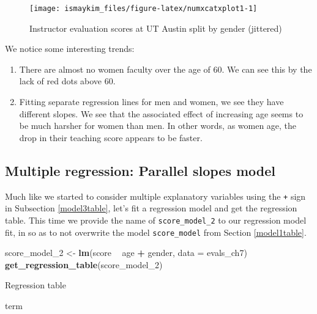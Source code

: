 \documentclass[12pt,]{krantz}
\makeatletter
\newenvironment{Shaded}{\begin{snugshade}}{\end{snugshade}}
\newcommand{\KeywordTok}[1]{\textcolor[rgb]{0.27,0.27,0.27}{\textbf{#1}}}
\newcommand{\DataTypeTok}[1]{\textcolor[rgb]{0.27,0.27,0.27}{#1}}
\newcommand{\DecValTok}[1]{\textcolor[rgb]{0.06,0.06,0.06}{#1}}
\newcommand{\StringTok}[1]{\textcolor[rgb]{0.5,0.5,0.5}{#1}}
\newcommand{\OperatorTok}[1]{\textcolor[rgb]{0.43,0.43,0.43}{\textbf{#1}}}
\newcommand{\NormalTok}[1]{#1}
\providecommand{\tightlist}{%
  \setlength{\itemsep}{0pt}\setlength{\parskip}{0pt}}
\newenvironment{kframe}{%
\medskip{}
\setlength{\fboxsep}{.8em}
 \def\at@end@of@kframe{}%
 \ifinner\ifhmode%
  \def\at@end@of@kframe{\end{minipage}}%
  \begin{minipage}{\columnwidth}%
 \fi\fi%
 \def\FrameCommand##1{\hskip\@totalleftmargin \hskip-\fboxsep
 \colorbox{shadecolor}{##1}\hskip-\fboxsep
     \hskip-\linewidth \hskip-\@totalleftmargin \hskip\columnwidth}%
 \MakeFramed {\advance\hsize-\width
   \@totalleftmargin\z@ \linewidth\hsize
   \@setminipage}}%
 {\par\unskip\endMakeFramed%
 \at@end@of@kframe}
\renewenvironment{Shaded}{\begin{kframe}}{\end{kframe}}
\makeatother
\begin{document}
\begin{figure}

{\centering \texttt{[image: ismaykim\_files/figure-latex/numxcatxplot1-1]} 

}

\caption{Instructor evaluation scores at UT Austin split by gender (jittered)}\label{fig:numxcatxplot1}
\end{figure}

We notice some interesting trends:

\begin{enumerate}
\def\labelenumi{\arabic{enumi}.}
\tightlist
\item
  There are almost no women faculty over the age of 60. We can see this
  by the lack of red dots above 60.
\item
  Fitting separate regression lines for men and women, we see they have
  different slopes. We see that the associated effect of increasing age
  seems to be much harsher for women than men. In other words, as women
  age, the drop in their teaching score appears to be faster.
\end{enumerate}

\subsection{Multiple regression: Parallel slopes
model}\label{model4table}

Much like we started to consider multiple explanatory variables using
the \texttt{+} sign in Subsection \ref{model3table}, let's fit a
regression model and get the regression table. This time we provide the
name of \texttt{score\_model\_2} to our regression model fit, in so as
to not overwrite the model \texttt{score\_model} from Section
\ref{model1table}.

\begin{Shaded}
\begin{Highlighting}[]
\NormalTok{score_model_}\DecValTok{2}\NormalTok{ <-}\StringTok{ }\KeywordTok{lm}\NormalTok{(score }\OperatorTok{~}\StringTok{ }\NormalTok{age }\OperatorTok{+}\StringTok{ }\NormalTok{gender, }\DataTypeTok{data =}\NormalTok{ evals_ch7)}
\KeywordTok{get_regression_table}\NormalTok{(score_model_}\DecValTok{2}\NormalTok{)}
\end{Highlighting}
\end{Shaded}

\label{tab:unnamed-chunk-251}Regression table

term
\end{document}
